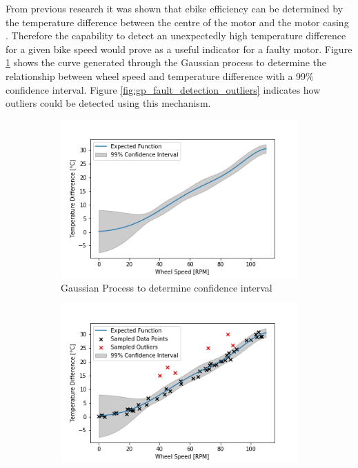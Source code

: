\documentclass[a4paper, 10pt]{article}
\numberwithin{equation}{section}
\begin{document}
From previous research it was shown that ebike efficiency can be determined by the temperature difference between the centre of the motor and the motor casing \cite{report:motor}. Therefore the capability to detect an unexpectedly high temperature difference for a given bike speed would prove as a useful indicator for a faulty motor. Figure \ref{fig:gp_fault_detection} shows the curve generated through the Gaussian process to determine the relationship between wheel speed and temperature difference with a 99\% confidence interval. Figure \ref{fig:gp_fault_detection_outliers} indicates how outliers could be detected using this mechanism.  



\begin{figure}[H]
    \centering
    \begin{subfigure}[b]{0.49\textwidth}
        \centering
        \includegraphics[width=\textwidth]{images/fault_tolerance_PL_1.png}
        
        \caption{Gaussian Process to determine confidence interval}
        \label{fig:gp_fault_detection}
    \end{subfigure}
    \hfill
    \begin{subfigure}[b]{0.49\textwidth}
        \centering
        \includegraphics[width=\textwidth]{images/fault_tolerance_PL_1_outliers.png}
        

\end{subfigure}
\end{figure}
\end{document}

